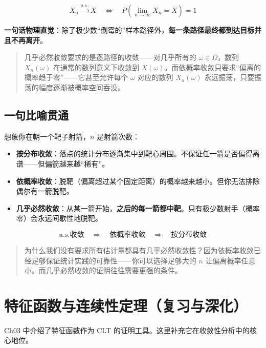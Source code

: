 \documentclass[
]{book}
\providecommand{\tightlist}{%
  \setlength{\itemsep}{0pt}\setlength{\parskip}{0pt}}
\begin{document}
\[X_n \xrightarrow{a.s.} X \quad \Leftrightarrow \quad P\left(\lim_{n \to \infty} X_n = X\right) = 1\]

\textbf{一句话物理直觉}：除了极少数``倒霉的''样本路径外，\textbf{每一条路径最终都到达目标并且不再离开}。

\begin{quote}
几乎必然收敛要求的是逐路径的收敛------对几乎所有的 \(\omega \in \Omega\)，数列 \(X_n(\omega)\) 在通常的数列意义下收敛到 \(X(\omega)\)。而依概率收敛只要求``偏离的概率趋于零''------它甚至允许每个 \(\omega\) 对应的数列 \(X_n(\omega)\) 永远振荡，只要振荡的幅度逐渐被概率空间吞没。
\end{quote}

\subsection{一句比喻贯通}\label{ux4e00ux53e5ux6bd4ux55bbux8d2fux901a}

想象你在朝一个靶子射箭，\(n\) 是射箭次数：

\begin{itemize}
\tightlist
\item
  \textbf{按分布收敛}：落点的统计分布逐渐集中到靶心周围。不保证任一箭是否偏得离谱------但偏箭越来越``稀有''。
\item
  \textbf{依概率收敛}：脱靶（偏离超过某个固定距离）的概率越来越小。但你无法排除偶尔有一箭脱靶。
\item
  \textbf{几乎必然收敛}：从某一箭开始，\textbf{之后的每一箭都中靶}。只有极少数射手（概率零）会永远间歇性地脱靶。
\end{itemize}

\[
\text{a.s.收敛} \quad \Rightarrow \quad \text{依概率收敛} \quad \Rightarrow \quad \text{按分布收敛}
\]

\begin{quote}
为什么我们没有要求所有估计量都具有几乎必然收敛性？因为依概率收敛已经足够保证统计实践的可靠性------你可以选择足够大的 \(n\) 让偏离概率任意小。而几乎必然收敛的证明往往需要更强的条件。
\end{quote}

\section{特征函数与连续性定理（复习与深化）}\label{ux7279ux5f81ux51fdux6570ux4e0eux8fdeux7eedux6027ux5b9aux7406ux590dux4e60ux4e0eux6df1ux5316}

Ch03 中介绍了特征函数作为 CLT 的证明工具。这里补充它在收敛性分析中的核心地位。
\end{document}
